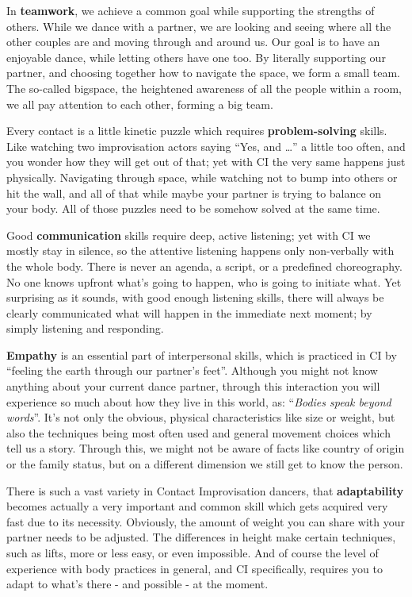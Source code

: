 In \textbf{teamwork}, we achieve a common goal while supporting the strengths of others.
While we dance with a partner, we are looking and seeing where all the other couples are and moving through and around us.
Our goal is to have an enjoyable dance, while letting others have one too.
By literally supporting our partner, and choosing together how to navigate the space, we form a small team.
The so-called \gls{bigspace}, the heightened awareness of all the people within a room, we all pay attention to each other, forming a big team.

Every contact is a little kinetic puzzle which requires \textbf{problem-solving} skills.
Like watching two improvisation actors saying ``Yes, and \ldots'' a little too often, and you wonder how they will get out of that; yet with CI the very same happens just physically.
Navigating through space, while watching not to bump into others or hit the wall, and all of that while maybe your partner is trying to balance on your body.
All of those puzzles need to be somehow solved at the same time.

Good \textbf{communication} skills require deep, active listening;
yet with CI we mostly stay in silence, so the attentive listening happens only non-verbally with the whole body.
There is never an agenda, a script, or a predefined choreography.
No one knows upfront what's going to happen, who is going to initiate what.
Yet surprising as it sounds, with good enough listening skills, there will always be clearly communicated what will happen in the immediate next moment; by simply listening and responding.

\textbf{Empathy} is an essential part of interpersonal skills, which is practiced in CI by ``feeling the earth through our partner's feet''.
Although you might not know anything about your current dance partner, through this interaction you will experience so much about how they live in this world, as: ``\textit{Bodies speak beyond words}''.
It's not only the obvious, physical characteristics like size or weight, but also the techniques being most often used and general movement choices which tell us a story.
Through this, we might not be aware of facts like country of origin or the family status, but on a different dimension we still get to know the person.

There is such a vast variety in Contact Improvisation dancers, that \textbf{adaptability} becomes actually a very important and common skill which gets acquired very fast due to its necessity.
Obviously, the amount of weight you can share with your partner needs to be adjusted.
The differences in height make certain techniques, such as lifts, more or less easy, or even impossible.
And of course the level of experience with body practices in general, and CI specifically, requires you to adapt to what's there - and possible - at the moment.


